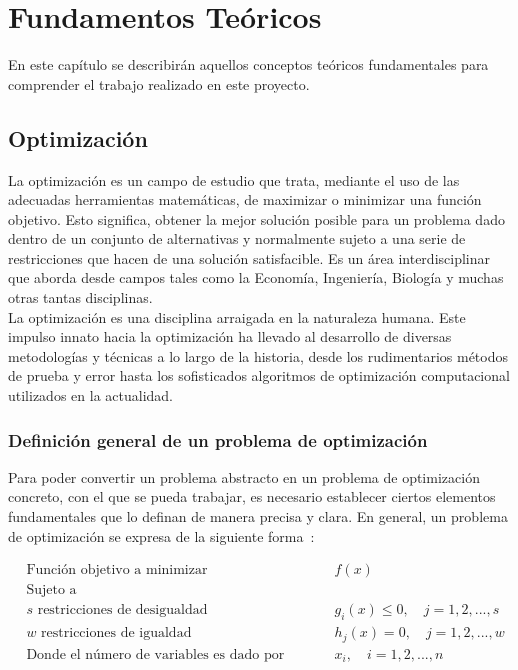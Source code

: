 \chapter{Fundamentos Teóricos}
En este capítulo se describirán aquellos conceptos teóricos fundamentales para comprender el trabajo realizado en este proyecto.

\section{Optimización}
La optimización es un campo de estudio que trata, mediante el uso de las adecuadas herramientas matemáticas, de maximizar o minimizar una función objetivo. Esto significa, obtener la mejor solución posible para un problema dado dentro de un conjunto de alternativas y normalmente sujeto a una serie de restricciones que hacen de una solución satisfacible. Es un área interdisciplinar que aborda desde campos tales como la Economía, Ingeniería, Biología y muchas otras tantas disciplinas.\\[6pt]
La optimización es una disciplina arraigada en la naturaleza humana. Este impulso innato hacia la optimización ha llevado al desarrollo de diversas metodologías y técnicas a lo largo de la historia, desde los rudimentarios métodos de prueba y error hasta los sofisticados algoritmos de optimización computacional utilizados en la actualidad.

\subsection{Definición general de un problema de optimización}
Para poder convertir un problema abstracto en un problema de optimización concreto, con el que se pueda trabajar, es necesario establecer ciertos elementos fundamentales que lo definan de manera precisa y clara. En general, un problema de optimización se expresa de la siguiente forma~\cite{inbook}:

\begin{subequations}
    \begin{alignat}{2}
         & \text{Función objetivo a minimizar}                       & \qquad & f(x)\label{eq:optProb}                             \\
         & \text{Sujeto a} \nonumber                                                                                               \\
         & s \text{ restricciones de desigualdad}                    & \qquad & g_i(x)\leq 0, \quad j=1,2,...,s\label{eq:optProb2} \\
         & w \text{ restricciones de igualdad}                       & \qquad & h_j(x) = 0, \quad j=1,2,...,w\label{eq:optProb3}   \\
         & \text{Donde el número de variables es dado por} \nonumber & \qquad & x_i, \quad i=1,2,...,n
    \end{alignat}
\end{subequations}

